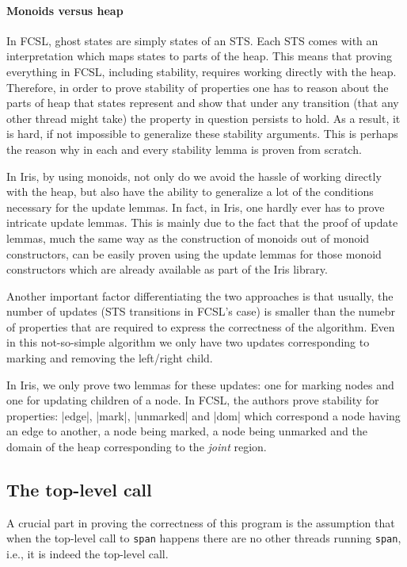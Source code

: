 \documentclass[]{scrartcl}
\def\MyMLe{\lstinline[language=MyML, basicstyle=\small\ttfamily, mathescape=true]}
\begin{document}
\paragraph{Monoids versus heap}
In FCSL, ghost states are simply states of an STS.
Each STS comes with an interpretation which maps states to parts of the heap.
This means that proving everything in FCSL, including stability, requires working directly
with the heap.
Therefore, in order to prove stability of properties one has to reason about the
parts of heap that states represent and show that under any transition
(that any other thread might take) the property in question persists to hold.
As a result, it is hard, if not impossible to generalize these stability arguments.
This is perhaps the reason why in \cite{Sergey:2015:MVF:2737924.2737964} each and every stability lemma is proven from scratch.

In Iris, by using monoids, not only do we avoid the hassle of working directly with the heap,
but also have the ability to generalize a lot of the conditions necessary for the update lemmas.
In fact, in Iris, one hardly ever has to prove intricate update lemmas.
This is mainly due to the fact that the proof of update lemmas, much the same way
as the construction of monoids out of monoid constructors, can be easily proven using the
update lemmas for those monoid constructors which are already available as part of the Iris library.

Another important factor differentiating the two approaches is that  usually, the number of
updates (STS transitions in FCSL's case) is smaller than the numebr of properties that
are required to express the correctness of the algorithm.
Even in this not-so-simple algorithm we only have two updates corresponding
to marking and removing the left/right child.

In Iris, we only prove two lemmas for these updates: one for marking nodes and one for
updating children of a node.
In FCSL, the authors prove stability for properties: \Coqe|edge|,
\Coqe|mark|, \Coqe|unmarked| and \Coqe|dom| which correspond a node having an edge
to another, a node being marked, a node being unmarked and the domain of the heap
corresponding to the \textit{joint} region.

\subsection{The top-level call}
A crucial part in proving the correctness of this program is the
assumption that when the top-level call to \MyMLe{span} happens there are
no other threads running \MyMLe|span|, i.e., it is indeed the top-level call.
\end{document}
